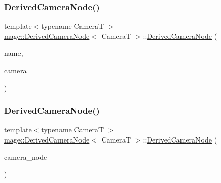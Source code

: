 \subsubsection{\texorpdfstring{Derived\+Camera\+Node()}{DerivedCameraNode()}\hspace{0.1cm}{\footnotesize\ttfamily [2/4]}}
{\footnotesize\ttfamily template$<$typename CameraT $>$ \\
\hyperlink{classmage_1_1_derived_camera_node}{mage\+::\+Derived\+Camera\+Node}$<$ CameraT $>$\+::\hyperlink{classmage_1_1_derived_camera_node}{Derived\+Camera\+Node} (\begin{DoxyParamCaption}\item[{const string \&}]{name,  }\item[{\hyperlink{namespacemage_a8c307fbcc33bce9b7f2aa4c26c3b95cf}{Unique\+Ptr}$<$ CameraT $>$ \&\&}]{camera }\end{DoxyParamCaption})\hspace{0.3cm}{\ttfamily [explicit]}}

\hypertarget{classmage_1_1_derived_camera_node_ae97b2a006e9e465e2530fdb814e855da}{}\label{classmage_1_1_derived_camera_node_ae97b2a006e9e465e2530fdb814e855da} 
\subsubsection{\texorpdfstring{Derived\+Camera\+Node()}{DerivedCameraNode()}\hspace{0.1cm}{\footnotesize\ttfamily [3/4]}}
{\footnotesize\ttfamily template$<$typename CameraT $>$ \\
\hyperlink{classmage_1_1_derived_camera_node}{mage\+::\+Derived\+Camera\+Node}$<$ CameraT $>$\+::\hyperlink{classmage_1_1_derived_camera_node}{Derived\+Camera\+Node} (\begin{DoxyParamCaption}\item[{const \hyperlink{classmage_1_1_derived_camera_node}{Derived\+Camera\+Node}$<$ CameraT $>$ \&}]{camera\+\_\+node }\end{DoxyParamCaption})}

\hypertarget{classmage_1_1_derived_camera_node_a4c53aa526ee4f81a8d9cf8439650d291}{}\label{classmage_1_1_derived_camera_node_a4c53aa526ee4f81a8d9cf8439650d291} 
